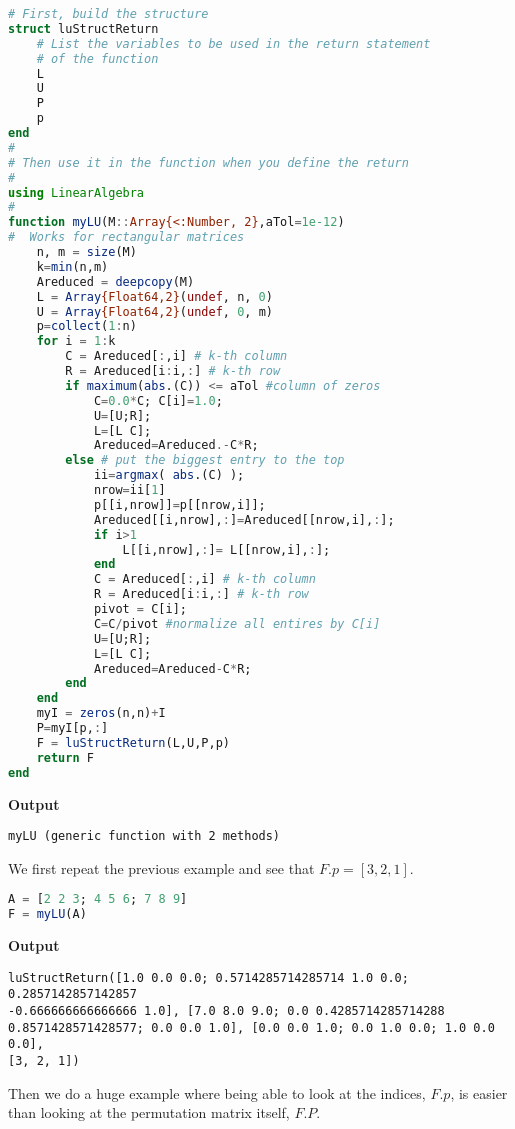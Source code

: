\begin{lstlisting}[language=Julia,style=mystyle]
# First, build the structure
struct luStructReturn
    # List the variables to be used in the return statement
    # of the function
    L
    U
    P
    p
end
#
# Then use it in the function when you define the return
#
using LinearAlgebra
#
function myLU(M::Array{<:Number, 2},aTol=1e-12)
#  Works for rectangular matrices  
    n, m = size(M)
    k=min(n,m)
    Areduced = deepcopy(M)
    L = Array{Float64,2}(undef, n, 0)
    U = Array{Float64,2}(undef, 0, m)
    p=collect(1:n)     
    for i = 1:k
        C = Areduced[:,i] # k-th column
        R = Areduced[i:i,:] # k-th row
        if maximum(abs.(C)) <= aTol #column of zeros
            C=0.0*C; C[i]=1.0;
            U=[U;R];  
            L=[L C];
            Areduced=Areduced.-C*R;
        else # put the biggest entry to the top  
            ii=argmax( abs.(C) );
            nrow=ii[1] 
            p[[i,nrow]]=p[[nrow,i]];
            Areduced[[i,nrow],:]=Areduced[[nrow,i],:];
            if i>1
                L[[i,nrow],:]= L[[nrow,i],:];
            end
            C = Areduced[:,i] # k-th column
            R = Areduced[i:i,:] # k-th row
            pivot = C[i];
            C=C/pivot #normalize all entires by C[i]
            U=[U;R]; 
            L=[L C];
            Areduced=Areduced-C*R;
        end
    end
    myI = zeros(n,n)+I
    P=myI[p,:]
    F = luStructReturn(L,U,P,p)
    return F
end
\end{lstlisting}
\textbf{Output} 
\begin{verbatim}
myLU (generic function with 2 methods)
\end{verbatim}

We first repeat the previous example and see that $F.p=[3, 2, 1]$.\\

\begin{lstlisting}[language=Julia,style=mystyle]
A = [2 2 3; 4 5 6; 7 8 9]
F = myLU(A)
\end{lstlisting}
\textbf{Output} 
\begin{verbatim}
luStructReturn([1.0 0.0 0.0; 0.5714285714285714 1.0 0.0; 0.2857142857142857
-0.666666666666666 1.0], [7.0 8.0 9.0; 0.0 0.4285714285714288
0.8571428571428577; 0.0 0.0 1.0], [0.0 0.0 1.0; 0.0 1.0 0.0; 1.0 0.0 0.0],
[3, 2, 1])
\end{verbatim}

Then we do a huge example where being able to look at the indices, $F.p$, is easier than looking at the permutation matrix itself, $F.P$.\\

